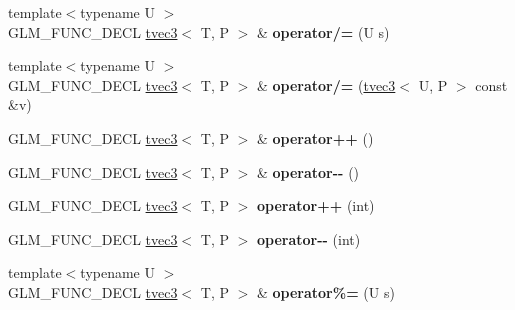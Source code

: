 \begin{DoxyCompactItemize}
\item 
{\footnotesize template$<$typename U $>$ }\\G\+L\+M\+\_\+\+F\+U\+N\+C\+\_\+\+D\+E\+CL \hyperlink{structglm_1_1detail_1_1tvec3}{tvec3}$<$ T, P $>$ \& {\bfseries operator/=} (U s)\hypertarget{structglm_1_1detail_1_1tvec3_ab0e67902096b95132ded9191df59f483}{}\label{structglm_1_1detail_1_1tvec3_ab0e67902096b95132ded9191df59f483}

\item 
{\footnotesize template$<$typename U $>$ }\\G\+L\+M\+\_\+\+F\+U\+N\+C\+\_\+\+D\+E\+CL \hyperlink{structglm_1_1detail_1_1tvec3}{tvec3}$<$ T, P $>$ \& {\bfseries operator/=} (\hyperlink{structglm_1_1detail_1_1tvec3}{tvec3}$<$ U, P $>$ const \&v)\hypertarget{structglm_1_1detail_1_1tvec3_af5f48f8e468b7941eff35170d5e10cab}{}\label{structglm_1_1detail_1_1tvec3_af5f48f8e468b7941eff35170d5e10cab}

\item 
G\+L\+M\+\_\+\+F\+U\+N\+C\+\_\+\+D\+E\+CL \hyperlink{structglm_1_1detail_1_1tvec3}{tvec3}$<$ T, P $>$ \& {\bfseries operator++} ()\hypertarget{structglm_1_1detail_1_1tvec3_a01056db42bfb77a320bf3516ea4951b4}{}\label{structglm_1_1detail_1_1tvec3_a01056db42bfb77a320bf3516ea4951b4}

\item 
G\+L\+M\+\_\+\+F\+U\+N\+C\+\_\+\+D\+E\+CL \hyperlink{structglm_1_1detail_1_1tvec3}{tvec3}$<$ T, P $>$ \& {\bfseries operator-\/-\/} ()\hypertarget{structglm_1_1detail_1_1tvec3_aaafe373e142ed03ab8e8d550cd660353}{}\label{structglm_1_1detail_1_1tvec3_aaafe373e142ed03ab8e8d550cd660353}

\item 
G\+L\+M\+\_\+\+F\+U\+N\+C\+\_\+\+D\+E\+CL \hyperlink{structglm_1_1detail_1_1tvec3}{tvec3}$<$ T, P $>$ {\bfseries operator++} (int)\hypertarget{structglm_1_1detail_1_1tvec3_a4cce0be26db53a9360fbfbe700c5b746}{}\label{structglm_1_1detail_1_1tvec3_a4cce0be26db53a9360fbfbe700c5b746}

\item 
G\+L\+M\+\_\+\+F\+U\+N\+C\+\_\+\+D\+E\+CL \hyperlink{structglm_1_1detail_1_1tvec3}{tvec3}$<$ T, P $>$ {\bfseries operator-\/-\/} (int)\hypertarget{structglm_1_1detail_1_1tvec3_a3e9d395ca33b49731052df266e08433b}{}\label{structglm_1_1detail_1_1tvec3_a3e9d395ca33b49731052df266e08433b}

\item 
{\footnotesize template$<$typename U $>$ }\\G\+L\+M\+\_\+\+F\+U\+N\+C\+\_\+\+D\+E\+CL \hyperlink{structglm_1_1detail_1_1tvec3}{tvec3}$<$ T, P $>$ \& {\bfseries operator\%=} (U s)\hypertarget{structglm_1_1detail_1_1tvec3_a96e6e5efb8b0d0f589345e6d5180e013}{}\label{structglm_1_1detail_1_1tvec3_a96e6e5efb8b0d0f589345e6d5180e013}


\end{DoxyCompactItemize}
